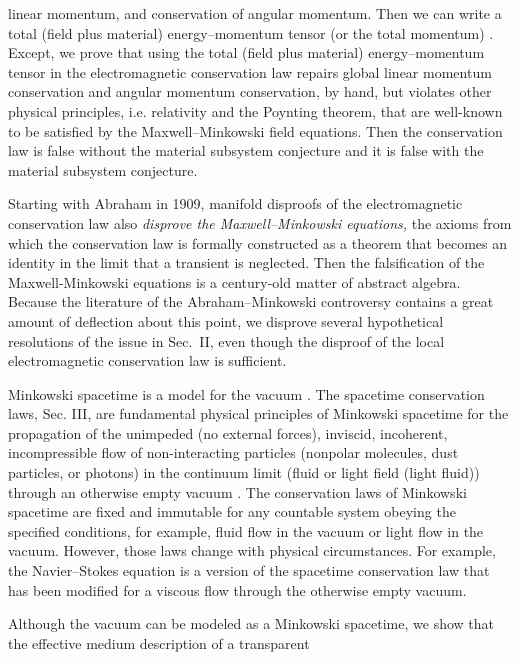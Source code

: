 \documentclass[twocolumn,amssymb,eqsecnum,aps,pra]{revtex4-2}
\begin{document}
linear momentum, and conservation of angular momentum.
Then we can write a total (field plus material) energy--momentum tensor
(or the total momentum) \cite{BIPfei,BIJMP,BIGord,BIBarn,BIBarnLou}.
Except, we prove that using the total (field plus material) 
energy--momentum tensor \cite{BIPfei,BIJMP} in the electromagnetic
conservation law repairs global linear momentum
conservation and angular momentum conservation, by hand, but
violates other physical principles, i.e. relativity and the Poynting
theorem, that are well-known to be satisfied by the Maxwell--Minkowski
field equations.
Then the conservation law is false without the material subsystem
conjecture and it is false with the material subsystem conjecture.
\par
Starting with Abraham \cite{BIAbr} in 1909, manifold disproofs
\cite{BIRL,BIBoydMil,BIPfei,BIAMC4,BIKemplatest,BIPenHaus,BIGord,BIBarn,BIBarnLou,BIKranys,BIObukPLA,BIBrevCons}
of the electromagnetic conservation law
also \textit{disprove the Maxwell--Minkowski equations,} the axioms
from which the conservation law is formally constructed as a theorem
that becomes an identity in the limit that a transient is neglected.
Then the falsification of the Maxwell-Minkowski equations is a 
century-old matter of abstract algebra.
Because the literature of the Abraham--Minkowski controversy contains
a great amount of deflection about this point, we disprove several
hypothetical resolutions of the issue in Sec.~II, even though the
disproof of the local electromagnetic conservation law 
is sufficient.
\par
Minkowski spacetime is a model for the vacuum \cite{BIGiu2}.
The spacetime conservation laws, Sec. III, are fundamental physical
principles of Minkowski spacetime for the propagation of the unimpeded
(no external forces), inviscid, incoherent, incompressible flow of
non-interacting particles (nonpolar molecules, dust particles, or
photons) in the continuum limit (fluid or light field (light fluid))
through an otherwise empty vacuum \cite{BIFox}.
The conservation laws of Minkowski spacetime are fixed and
immutable for any countable system obeying the specified conditions,
for example, fluid flow in the vacuum or light flow in the vacuum.
However, those laws change with physical circumstances.
For example, the Navier--Stokes equation is a version of the
spacetime conservation law that has been modified for a viscous
flow through the otherwise empty vacuum.
\par
Although the vacuum can be modeled as a Minkowski spacetime, 
we show that the effective medium description of a transparent
\end{document}
